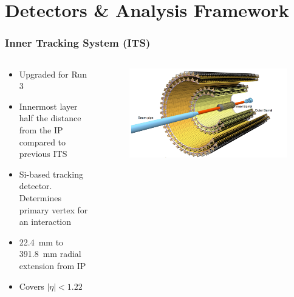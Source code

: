 \documentclass[11pt]{beamer}
\begin{document}
\section{Detectors \& Analysis Framework}

\begin{frame}
    \frametitle{Inner Tracking System (ITS)}

    \begin{columns}[c]
        \begin{column}{0.4\textwidth}
            \begin{itemize}
                \item Upgraded for Run 3
                \item Innermost layer half the distance from the IP compared to previous ITS
                \item Si-based tracking detector. Determines primary vertex for an interaction
                \item \SI{22.4}{\milli\metre} to \SI{391.8}{\milli\metre} radial extension from IP
                \item Covers $|\eta| < 1.22$
            \end{itemize}
        \end{column}

        \begin{column}{0.6\textwidth}
            \begin{figure}[h]
                \begin{center}
                    \includegraphics[width=\textwidth]{Figs/ITS_Schematic.png}
                \end{center}
            \end{figure}
        \end{column}
    \end{columns}

\end{frame}
\end{document}
